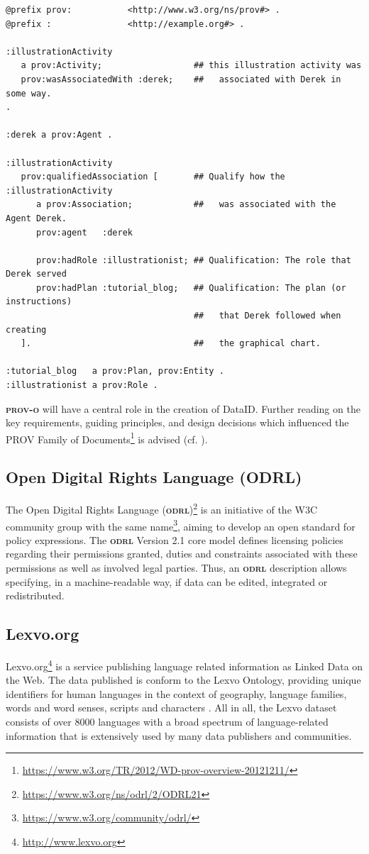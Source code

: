 \documentclass[a4paper,english,twoside,BCOR1.5cm,headsepline,DIV12,appendixprefix,final,12pt]{scrbook}
\newcommand{\odrl}{{\scshape\bfseries odrl}\xspace}
\newcommand{\prov}{{\scshape\bfseries prov-o}\xspace}
\newcommand\footnoteurl[1]{\footnote{\scriptsize\url{#1}}}
\begin{document}
\begin{lstlisting}[language=ttl, captionpos=b, label=lst:dcex,linewidth=\columnwidth,breaklines=true]
@prefix prov: 			<http://www.w3.org/ns/prov#> .
@prefix :     			<http://example.org#> .

:illustrationActivity
   a prov:Activity;                  ## this illustration activity was 
   prov:wasAssociatedWith :derek;    ##   associated with Derek in some way.
.

:derek a prov:Agent .

:illustrationActivity
   prov:qualifiedAssociation [       ## Qualify how the :illustrationActivity
      a prov:Association;            ##   was associated with the Agent Derek.
      prov:agent   :derek              

      prov:hadRole :illustrationist; ## Qualification: The role that Derek served
      prov:hadPlan :tutorial_blog;   ## Qualification: The plan (or instructions)
                                     ##   that Derek followed when creating 
   ].                                ##   the graphical chart.

:tutorial_blog   a prov:Plan, prov:Entity .
:illustrationist a prov:Role .
\end{lstlisting}

\prov will have a central role in the creation of DataID. Further reading on the key requirements, guiding principles, and design decisions which influenced the PROV Family of Documents\footnoteurl{https://www.w3.org/TR/2012/WD-prov-overview-20121211/} is advised (cf. \cite{MoreauProv2015}).

\subsection{Open Digital Rights Language (ODRL)}
\label{sec:odrl}
The Open Digital Rights Language (\odrl)\footnoteurl{https://www.w3.org/ns/odrl/2/ODRL21} is an initiative of the W3C community group with the same name\footnoteurl{https://www.w3.org/community/odrl/}, aiming to develop an open standard for policy expressions. 
The \odrl Version 2.1 core model defines
licensing policies regarding their permissions
granted, duties and constraints associated with these
permissions as well as involved legal parties. Thus, an \odrl
description allows specifying, in a machine-readable way, if
data can be edited, integrated or redistributed.

\subsection{Lexvo.org}
\label{sec:lexvo}
Lexvo.org\footnoteurl{http://www.lexvo.org} is a service publishing language related information as Linked Data on the Web. The data published is conform to the Lexvo Ontology, providing unique identifiers for human languages in the context of geography, language families, words and word senses, scripts and characters \cite{Lexvo2015DeMelo}. All in all, the Lexvo dataset consists of over 8000 languages with a broad spectrum of language-related information that is extensively used by many data publishers and communities.
\end{document}

